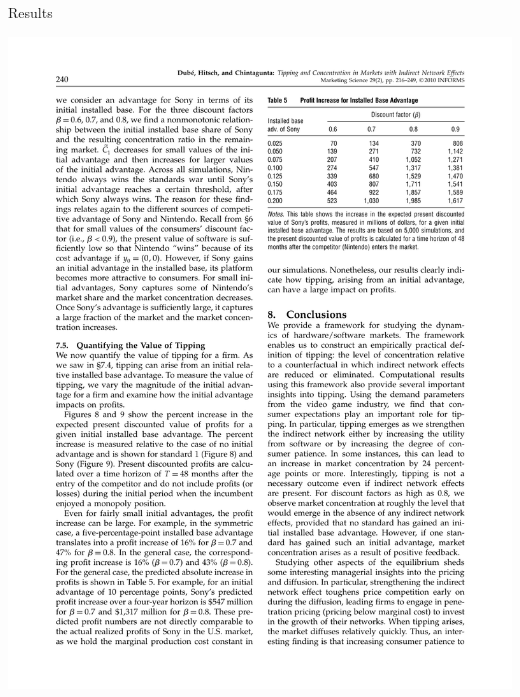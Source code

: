 \documentclass[xcolor=pdftex,dvipsnames,table,mathserif,aspectratio=169]{beamer}
\begin{document}
\begin{frame}{Results}
\begin{center}
\includegraphics[scale=0.75]{resources/dube-table5}
\end{center}
\end{frame}
\end{document}
